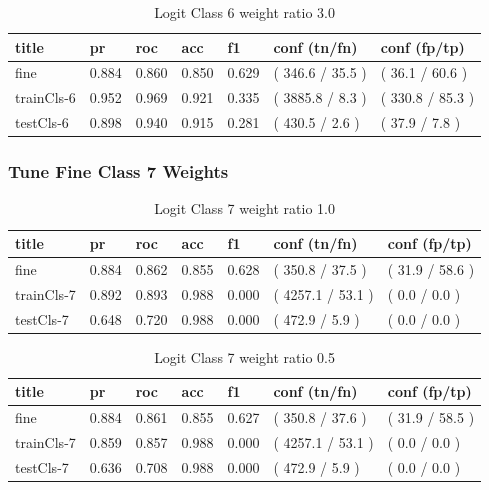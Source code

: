 \documentclass[ms]{nuthesis}
\begin{document}
\FloatBarrier
\begin{table}[H]
\centering
\caption{Logit Class 6 weight ratio 3.0}
\label{tab:LogRegCls6-Wt3}
\begin{tabular}{|l||l||l||l||l||l||l|}\toprule
title & pr & roc & acc & f1 & conf (tn/fn) & conf (fp/tp) \\ \midrule
fine & 0.884 & 0.860 & 0.850 & 0.629 & ( 346.6 / 35.5 ) & ( 36.1 / 60.6 ) \\
trainCls-6 & 0.952 & 0.969 & 0.921 & 0.335 & ( 3885.8 / 8.3 ) & ( 330.8 / 85.3 ) \\
testCls-6 & 0.898 & 0.940 & 0.915 & 0.281 & ( 430.5 / 2.6 ) & ( 37.9 / 7.8 ) \\ \bottomrule
\end{tabular}
\end{table}
\FloatBarrier


\subsubsection{Tune Fine Class 7 Weights}
\FloatBarrier
\begin{table}[H]
\centering
\caption{Logit Class 7 weight ratio 1.0}
\label{tab:LogRegCls7-Wt1}
\begin{tabular}{|l||l||l||l||l||l||l|}\toprule
title & pr & roc & acc & f1 & conf (tn/fn) & conf (fp/tp) \\ \midrule
fine & 0.884 & 0.862 & 0.855 & 0.628 & ( 350.8 / 37.5 ) & ( 31.9 / 58.6 ) \\
trainCls-7 & 0.892 & 0.893 & 0.988 & 0.000 & ( 4257.1 / 53.1 ) & ( 0.0 / 0.0 ) \\
testCls-7 & 0.648 & 0.720 & 0.988 & 0.000 & ( 472.9 / 5.9 ) & ( 0.0 / 0.0 ) \\ \bottomrule
\end{tabular}
\end{table}
\FloatBarrier

\FloatBarrier
\begin{table}[H]
\centering
\caption{Logit Class 7 weight ratio 0.5}
\label{tab:LogRegCls7-Wtp5}
\begin{tabular}{|l||l||l||l||l||l||l|}\toprule
title & pr & roc & acc & f1 & conf (tn/fn) & conf (fp/tp) \\ \midrule
fine & 0.884 & 0.861 & 0.855 & 0.627 & ( 350.8 / 37.6 ) & ( 31.9 / 58.5 ) \\
trainCls-7 & 0.859 & 0.857 & 0.988 & 0.000 & ( 4257.1 / 53.1 ) & ( 0.0 / 0.0 ) \\
testCls-7 & 0.636 & 0.708 & 0.988 & 0.000 & ( 472.9 / 5.9 ) & ( 0.0 / 0.0 ) \\ \bottomrule
\end{tabular}
\end{table}
\FloatBarrier
\end{document}
